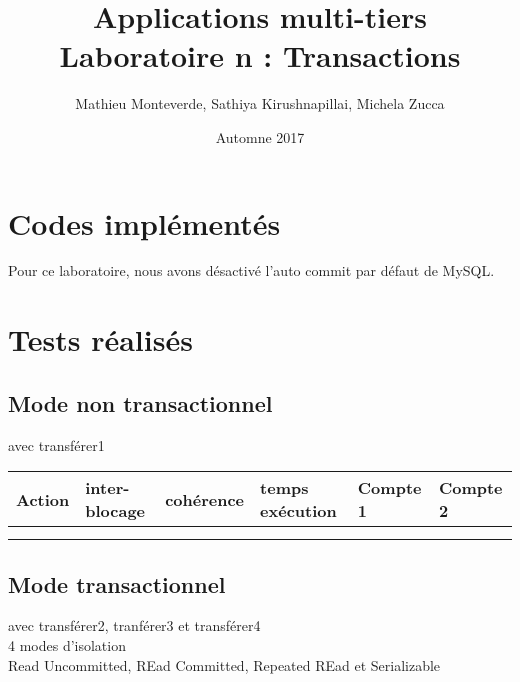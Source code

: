 \documentclass[francais,12pt]{article}
\title{Applications multi-tiers \\ Laboratoire n\textordmasculine2 : Transactions}
\author{Mathieu Monteverde, Sathiya Kirushnapillai, Michela Zucca}
\date{Automne 2017}
\begin{document}
	
	\maketitle
	
	\setlength{\parskip}{1em}
	
	\section*{Codes implémentés}
    Pour ce laboratoire, nous avons désactivé l'auto commit par défaut de MySQL.
	
    
    
    
    
    
	\section*{Tests réalisés}
    
	\subsection*{Mode non transactionnel}
	avec transférer1
	
		\begin{tabular}{|l|l|l|l|l|l|}
		\hline
		 Action & inter-blocage & cohérence & temps exécution & Compte 1 & Compte 2\\
		\hline
		\rowcolor{lightgray}\multicolumn{6}{|l|}{transférer1}\\
		\hline
		 & & & & &\\
		\hline
	\end{tabular}
	
	
	\subsection*{Mode transactionnel}
	avec transférer2, tranférer3 et transférer4\\
	4 modes d'isolation\\
	Read Uncommitted, REad Committed, Repeated REad et Serializable
	
\end{document}
